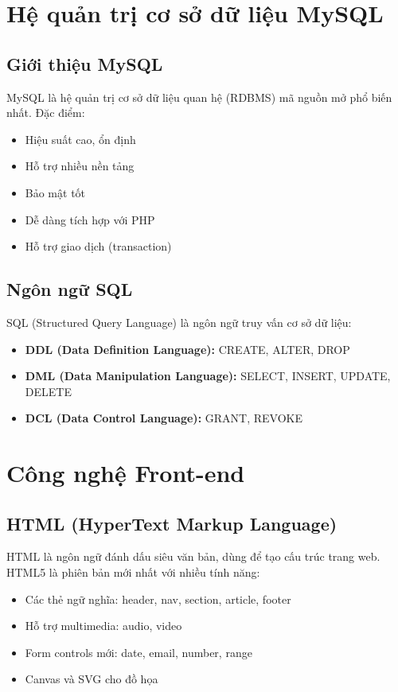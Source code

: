 \documentclass[a4paper,12pt]{report}
\begin{document}
\section{Hệ quản trị cơ sở dữ liệu MySQL}

\subsection{Giới thiệu MySQL}
MySQL là hệ quản trị cơ sở dữ liệu quan hệ (RDBMS) mã nguồn mở phổ biến nhất. Đặc điểm:
\begin{itemize}
    \item Hiệu suất cao, ổn định
    \item Hỗ trợ nhiều nền tảng
    \item Bảo mật tốt
    \item Dễ dàng tích hợp với PHP
    \item Hỗ trợ giao dịch (transaction)
\end{itemize}

\subsection{Ngôn ngữ SQL}
SQL (Structured Query Language) là ngôn ngữ truy vấn cơ sở dữ liệu:
\begin{itemize}
    \item \textbf{DDL (Data Definition Language):} CREATE, ALTER, DROP
    \item \textbf{DML (Data Manipulation Language):} SELECT, INSERT, UPDATE, DELETE
    \item \textbf{DCL (Data Control Language):} GRANT, REVOKE
\end{itemize}

\section{Công nghệ Front-end}

\subsection{HTML (HyperText Markup Language)}
HTML là ngôn ngữ đánh dấu siêu văn bản, dùng để tạo cấu trúc trang web. HTML5 là phiên bản mới nhất với nhiều tính năng:
\begin{itemize}
    \item Các thẻ ngữ nghĩa: header, nav, section, article, footer
    \item Hỗ trợ multimedia: audio, video
    \item Form controls mới: date, email, number, range
    \item Canvas và SVG cho đồ họa
\end{itemize}
\end{document}
